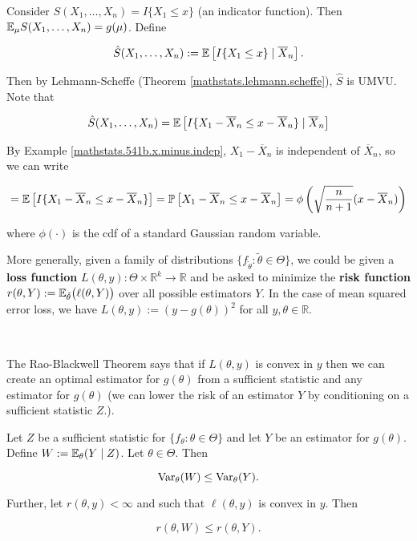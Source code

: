 \begin{solution}

Consider \(S(X_1, \ldots, X_n) = I \{X_1 \leq x\}\) (an indicator function). Then  \(\E_\mu S(X_1, \ldots, X_n) = g(\mu)\). Define 

\[
\hat{S}(X_1, \ldots, X_n) := \E \left[I \{X_1 \leq x\} \mid \overline{X}_n \right].
\]

Then by Lehmann-Scheffe (Theorem \ref{mathstats.lehmann.scheffe}), \(\hat{S}\) is UMVU. Note that 

\[
\hat{S}(X_1, \ldots, X_n) = \E \left[I \{X_1 - \overline{X}_n \leq x - \overline{X}_n\} \mid \overline{X}_n \right]
\]

By Example \ref{mathstats.541b.x.minus.indep}, \(X_1 - \overline{X}_n\) is independent of \(\overline{X}_n\), so we can write

\[
= \E \left[I \{X_1 - \overline{X}_n \leq x - \overline{X}_n\} \right] = \mathbb{P} \left[X_1 - \overline{X}_n \leq x - \overline{X}_n \right] = \phi \left(  \sqrt{ \frac{n}{n+1}} (x - \overline{X}_n) \right)
\]

where \(\phi(\cdot)\) is the cdf of a standard Gaussian random variable.

\end{solution}

More generally, given a family of distributions \(\{f_{\tilde{\theta}}: \tilde{\theta} \in \Theta\}\), we could be given a \textbf{loss function} \(L(\theta, y): \Theta \times \mathbb{R}^k \to \mathbb{R}\) and be asked to minimize the \textbf{risk function} \(r(\theta, Y) := \E_{\tilde{\theta}} \big( \ell(\theta, Y) \big)  \) over all possible estimators \(Y\). In the case of mean squared error loss, we have \(L(\theta,y) := (y - g(\theta))^2\) for all \(y, \theta \in \mathbb{R}\).

\

The Rao-Blackwell Theorem says that if \(L(\theta, y)\) is convex in \(y\) then we can create an optimal estimator for \(g(\theta)\) from a sufficient statistic and any estimator for \(g(\theta)\) (we can lower the risk of an estimator \(Y\) by conditioning on a sufficient statistic \(Z\).).

\begin{theorem}\label{mathstats.thm.rao.blackwell} Let \(Z\) be a sufficient statistic for \(\{f_\theta:\theta \in \Theta\}\) and let \(Y\) be an estimator for \(g(\theta)\). Define \(W:= \E_\theta(Y \mid Z)\). Let \(\theta \in \Theta\). Then



\[
\Var_\theta(W) \leq \Var_\theta (Y).
\]

Further, let \(r(\theta, y) < \infty\) and such that \(\ell(\theta, y)\) is convex in \(y\). Then

\[
r(\theta, W) \leq r(\theta, Y).
\]

\end{theorem}

